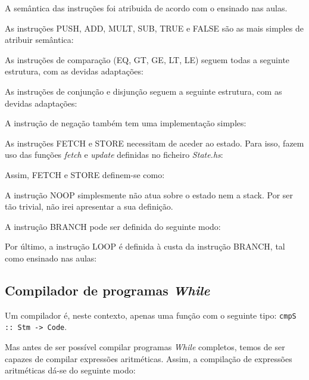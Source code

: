\documentclass[11pt,a4paper]{report}
\newcommand{\while}[0]{\textit{While}\xspace}
\begin{document}
\par A semântica das instruções foi atribuida de acordo com o ensinado nas aulas.

\par As instruções PUSH, ADD, MULT, SUB, TRUE e FALSE são as mais simples de atribuir semântica:

\newpage

\par As instruções de comparação (EQ, GT, GE, LT, LE) seguem todas a seguinte estrutura, com as devidas adaptações:

\par As instruções de conjunção e disjunção seguem a seguinte estrutura, com as devidas adaptações:

\par A instrução de negação também tem uma implementação simples:

\par As instruções FETCH e STORE necessitam de aceder ao estado. Para isso, fazem uso das funções \textit{fetch} e \textit{update} definidas no ficheiro \textit{State.hs}:

\par Assim, FETCH e STORE definem-se como:

\par A instrução NOOP simplesmente não atua sobre o estado nem a stack. Por ser tão trivial, não irei apresentar a sua definição.

\par A instrução BRANCH pode ser definida do seguinte modo:

\par Por último, a instrução LOOP é definida à custa da instrução BRANCH, tal como ensinado nas aulas:

\newpage

\subsection{Compilador de programas \while} \label{subsection:compilador-maquina-am}

\par Um compilador é, neste contexto, apenas uma função com o seguinte tipo: \texttt{cmpS :: Stm -> Code}.

\par Mas antes de ser possível compilar programas \while completos, temos de ser capazes de compilar expressões aritméticas. Assim, a compilação de expressões aritméticas dá-se do seguinte modo:
\end{document}
